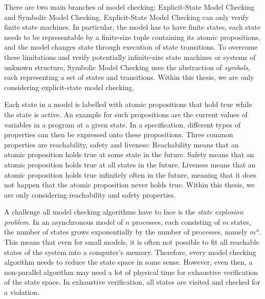\documentclass[
fancyheadings, %
%
%
]{stsreprt}
\begin{document}
There are two main branches of model checking:
Explicit-State Model Checking and Symbolic Model Checking.
Explicit-State Model Checking can only verify finite state machines.
In particular, the model has to have finite states, each state needs to be representable by a finite-size tuple containing its atomic propositions, and the model changes state through execution of state transitions.
To overcome these limitations and verify potentially infinite-size state machines or systems of unknown structure, Symbolic Model Checking uses the abstraction of \emph{symbols}, each representing a set of states and transitions.
Within this thesis, we are only considering explicit-state model checking.

Each state in a model is labelled with atomic propositions that hold true while the state is active.
An example for such propositions are the current values of variables in a program at a given state.
In a specification, different types of properties can then be expressed onto these propositions.
Three common properties are reachability, safety and liveness:
Reachability means that an atomic proposition holds true at some state in the future.
Safety means that an atomic proposition holds true at all states in the future.
Liveness means that an atomic proposition holds true infinitely often in the future, meaning that it does not happen that the atomic proposition never holds true.
Within this thesis, we are only considering reachability and safety properties.

A challenge all model checking algorithms have to face is the \emph{state explosion problem}.
In an asynchronous model of $n$ processes, each consisting of $m$ states, the number of states grows exponentially by the number of processes, namely $m^n$.
This means that even for small models, it is often not possible to fit all reachable states of the system into a computer's memory.
Therefore, every model checking algorithm needs to reduce the state space in some sense.
However, even then, a non-parallel algorithm may need a lot of physical time for exhaustive verification of the state space.
In exhaustive verification, all states are visited and checked for a violation.
\cite{Clarke2018.Introduction-to-Model-Checking,Holzmann2018.Explicit-State-Model-Checking}
\end{document}
